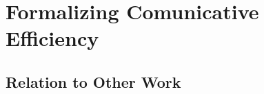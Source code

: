 \documentclass[10pt,twoside,lineno]{article}
\begin{document}








\section{Formalizing Comunicative Efficiency}
\subsection{Relation to Other Work}



\end{document}
